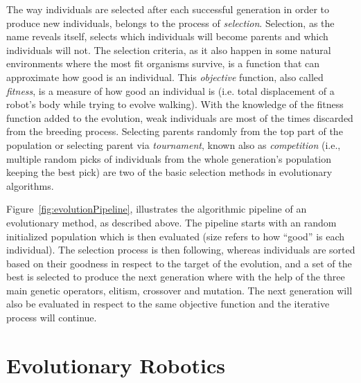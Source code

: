 The way individuals are selected after each successful generation in order to produce new individuals, belongs to the process of \emph{selection}. Selection, as the name reveals itself, selects which individuals will become parents and which individuals will not. The selection criteria, as it also happen in some natural environments where the most fit organisms survive, is a function that can approximate how good is an individual. This \emph{objective} function, also called \emph{fitness}, is a measure of how good an individual is (i.e. total displacement of a robot's body while trying to evolve walking). With the knowledge of the fitness function added to the evolution, weak individuals are most of the times discarded from the breeding process. Selecting parents randomly from the top part of the population or selecting parent via \emph{tournament}, known also as \emph{competition} (i.e., multiple random picks of individuals from the whole generation's population keeping the best pick) are two of the basic selection methods in evolutionary algorithms.

Figure~\ref{fig:evolutionPipeline}, illustrates the algorithmic pipeline of an evolutionary method, as described above. The pipeline starts with an random initialized population which is then evaluated (size refers to how ``good'' is each individual). The selection process is then following, whereas individuals are sorted based on their goodness in respect to the target of the evolution, and a set of the best is selected to produce the next generation where with the help of the three main genetic operators, elitism, crossover and mutation. The next generation will also be evaluated in respect to the same objective function and the iterative process will continue.

\section{Evolutionary Robotics}

